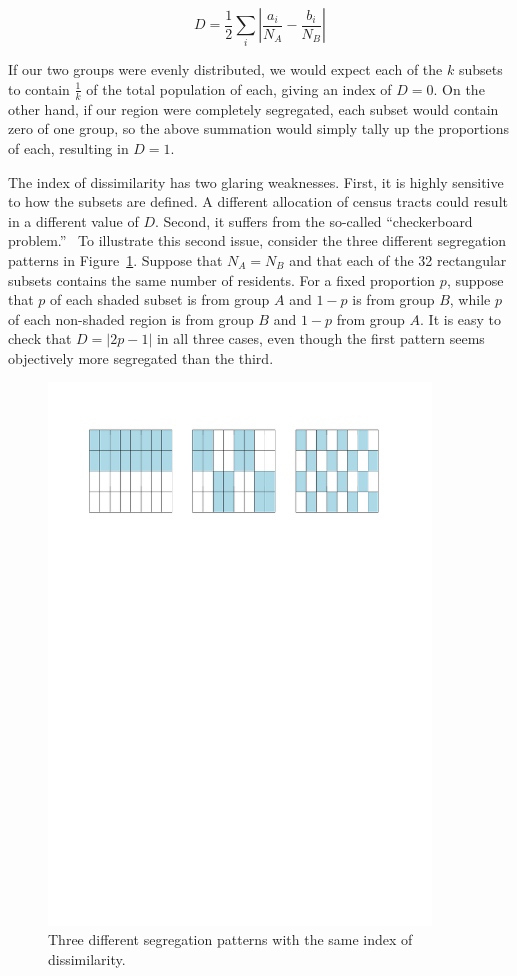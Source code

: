 \documentclass{article}
\theoremstyle{theorem}
\theoremstyle{definition}
\begin{document}
\begin{equation}
  D = \frac{1}{2} \sum_i \left\lvert \frac{a_i}{N_A} - \frac{b_i}{N_B} \right\rvert
\end{equation}

If our two groups were evenly distributed, we would expect each of the $k$ subsets to contain $\frac{1}{k}$ of the total population of each, giving an index of $D = 0$. On the other hand, if our region were completely segregated, each subset would contain zero of one group, so the above summation would simply tally up the proportions of each, resulting in $D = 1$.

The index of dissimilarity has two glaring weaknesses. First, it is highly sensitive to how the subsets are defined. A different allocation of census tracts could result in a different value of $D$. Second, it suffers from the so-called ``checkerboard problem.''~\cite{morrill91} To illustrate this second issue, consider the three different segregation patterns in Figure~\ref{fig:checkerboard}. Suppose that $N_A = N_B$ and that each of the 32 rectangular subsets contains the same number of residents. For a fixed proportion $p$, suppose that $p$ of each shaded subset is from group $A$ and $1-p$ is from group $B$, while $p$ of each non-shaded region is from group $B$ and $1-p$ from group $A$. It is easy to check that $D = \lvert 2p-1 \rvert$ in all three cases, even though the first pattern seems objectively more segregated than the third.

\begin{figure}\centering
  \includegraphics[width=4in]{checkerboard.pdf}
  \caption{Three different segregation patterns with the same index of dissimilarity.}
  \label{fig:checkerboard}
\end{figure}
\end{document}
